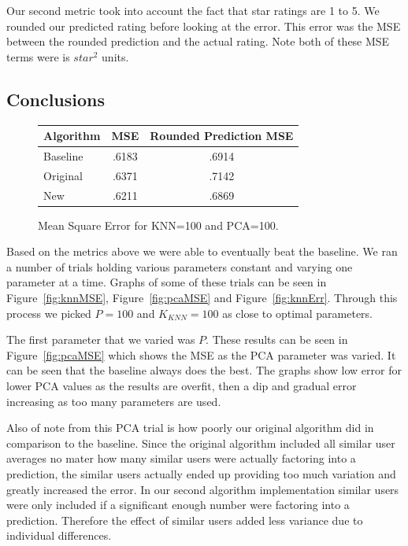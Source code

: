 \documentclass[10pt,twocolumn,letterpaper]{article}
\begin{document}
Our second metric took into account the fact that star ratings are 1 to 5. We rounded our predicted rating before looking at the error. This error was the MSE between the rounded prediction and the actual rating. Note both of these MSE terms were is $star^2$ units.

\subsection{Conclusions}

\renewcommand{\arraystretch}{1.15}
\begin{figure}[t]
\begin{center}
	\begin{tabular}{ l c c }
		Algorithm & MSE & Rounded Prediction MSE \\ \hline
		Baseline & .6183 & .6914 \\
		Original & .6371 & .7142 \\
		New & .6211 & .6869
	\end{tabular}
	\end{center}
	\caption{Mean Square Error for KNN=100 and PCA=100.}
	\label{tbl:MSE}
\end{figure}

Based on the metrics above we were able to eventually beat the baseline. We ran a number of trials holding various parameters constant and varying one parameter at a time. Graphs of some of these trials can be seen in Figure~\ref{fig:knnMSE}, Figure~\ref{fig:pcaMSE} and Figure~\ref{fig:knnErr}. Through this process we picked $P=100$ and $K_{KNN}=100$ as close to optimal parameters.

The first parameter that we varied was $P$. These results can be seen in Figure~\ref{fig:pcaMSE} which shows the MSE as the PCA parameter was varied. It can be seen that the baseline always does the best. The graphs show low error for lower PCA values as the results are overfit, then a dip and gradual error increasing as too many parameters are used.

Also of note from this PCA trial is how poorly our original algorithm did in comparison to the baseline. Since the original algorithm included all similar user averages no mater how many similar users were actually factoring into a prediction, the similar users actually ended up providing too much variation and greatly increased the error. In our second algorithm implementation similar users were only included if a significant enough number were factoring into a prediction. Therefore the effect of similar users added less variance due to individual differences.
\end{document}
